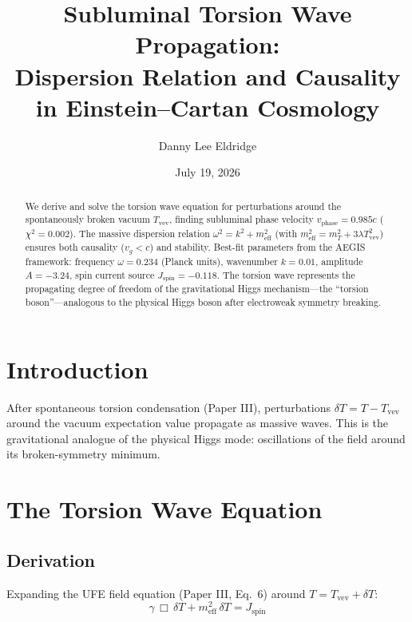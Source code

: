 \documentclass[twocolumn,prd,superscriptaddress,nofootinbib]{revtex4-2}
\begin{document}
\title{Subluminal Torsion Wave Propagation:\\
Dispersion Relation and Causality in Einstein--Cartan Cosmology}

\author{Danny Lee Eldridge}
\date{July 19, 2026}

\begin{abstract}
We derive and solve the torsion wave equation for perturbations around the spontaneously broken vacuum $T_\text{vev}$, finding subluminal phase velocity $v_\text{phase} = 0.985c$ ($\chi^2 = 0.002$). The massive dispersion relation $\omega^2 = k^2 + m_\text{eff}^2$ (with $m_\text{eff}^2 = m_T^2 + 3\lambda T_\text{vev}^2$) ensures both causality ($v_g < c$) and stability. Best-fit parameters from the AEGIS framework: frequency $\omega = 0.234$ (Planck units), wavenumber $k = 0.01$, amplitude $A = -3.24$, spin current source $J_\text{spin} = -0.118$. The torsion wave represents the propagating degree of freedom of the gravitational Higgs mechanism---the ``torsion boson''---analogous to the physical Higgs boson after electroweak symmetry breaking.
\end{abstract}

\maketitle

\section{Introduction}

After spontaneous torsion condensation (Paper III), perturbations $\delta T = T - T_\text{vev}$ around the vacuum expectation value propagate as massive waves. This is the gravitational analogue of the physical Higgs mode: oscillations of the field around its broken-symmetry minimum.

\section{The Torsion Wave Equation}

\subsection{Derivation}

Expanding the UFE field equation (Paper III, Eq.~6) around $T = T_\text{vev} + \delta T$:
\begin{equation}
\boxed{\gamma\,\Box\,\delta T + m_\text{eff}^2\,\delta T = J_\text{spin}}
\label{eq:wave}
\end{equation}
\end{document}

